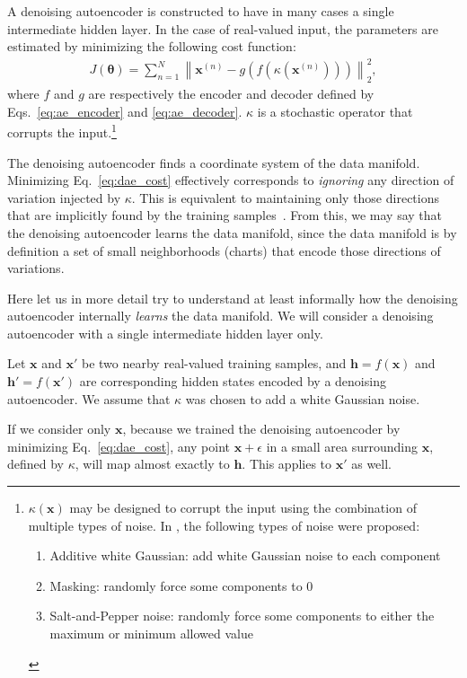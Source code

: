\documentclass{now}
\newcommand{\vect}[1]{\mathbf{#1}}
\newcommand{\vects}[1]{\boldsymbol{#1}}
\newcommand{\vh}[0]{\vect{h}}
\newcommand{\vx}[0]{\vect{x}}
\newcommand{\TT}[0]{{\vects{\theta}}}
\begin{document}
A denoising autoencoder is constructed to have in many cases a single
intermediate hidden layer. In the case of real-valued input, the parameters are
estimated by minimizing the following cost function:
\begin{align}
    \label{eq:dae_cost}
    J(\TT) =  \sum_{n=1}^N \left\| \vx^{(n)} -
    g\left(f(\kappa(\vx^{(n)}))\right) \right\|_2^2,
\end{align}
where $f$ and $g$ are respectively the encoder and decoder defined by
Eqs.~\eqref{eq:ae_encoder} and \eqref{eq:ae_decoder}.  $\kappa$ is a stochastic
operator that corrupts the input.\footnote{
$\kappa(\vx)$ may be designed to corrupt the input using the combination of
multiple types of noise. In \citep{Vincent2010}, the following types of noise
were proposed:
\begin{enumerate}
        \vspace{-5mm}
    \itemsep 0em
    \item Additive white Gaussian: add white Gaussian noise to each component
    \item Masking: randomly force some components to $0$
    \item Salt-and-Pepper noise: randomly force some components to either the
        maximum or minimum allowed value
\end{enumerate}
}

The denoising autoencoder finds a coordinate system of the data manifold.
Minimizing Eq.~\eqref{eq:dae_cost} effectively corresponds to \textit{ignoring}
any direction of variation injected by $\kappa$. This is equivalent to
maintaining only those directions that are implicitly found by the training
samples~\citep{Vincent2010}. From this, we may say that the denoising
autoencoder learns the data manifold, since the data manifold is by definition a
set of small neighborhoods (charts) that encode those directions of variations.

Here let us in more detail try to understand at least informally how the
denoising autoencoder internally \textit{learns} the data manifold. We will
consider a denoising autoencoder with a single intermediate hidden layer only.

Let $\vx$ and $\vx'$ be two nearby real-valued training samples, and
$\vh=f(\vx)$ and $\vh'=f(\vx')$ are corresponding hidden states encoded by a
denoising autoencoder. We assume that $\kappa$ was chosen to add a white
Gaussian noise.

If we consider only $\vx$, because we trained the denoising autoencoder by
minimizing Eq.~\eqref{eq:dae_cost}, any point $\vx + \epsilon$ in a small area
surrounding $\vx$, defined by $\kappa$, will map almost exactly to $\vh$. This
applies to $\vx'$ as well. 
\end{document}
